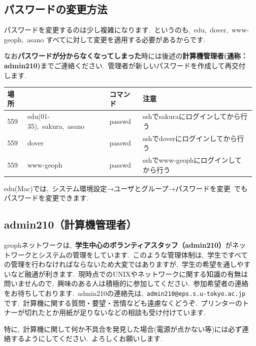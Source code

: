 \documentclass{jarticle}
\begin{document}
\subsection{パスワードの変更方法}
パスワードを変更するのは少し複雑になります.\ というのも,\ edu,\ dover,\ www-geoph,\ asano  すべてに対して変更を適用する必要があるからです.\ 

なお{\bf パスワードが分からなくなってしまった}時には後述の{\bf 計算機管理者(通称：admin210)}までご連絡ください.\ 管理者が新しいパスワードを作成して再交付します.\ 

\begin{table}[H]
  \centering
  \begin{tabular}{|l|l|l|l|} \hline
    場所 & & コマンド & 注意 \\ \hline
    559 & edu(01-35),\ sakura,\ asano & passwd & sshでsakuraにログインしてから行う \\ \hline
    559 & dover & passwd & sshでdoverにログインしてから行う  \\ \hline
    559 & www-geoph & passwd & sshでwww-geophにログインしてから行う  \\ \hline

  \end{tabular}
\end{table}
edu(Mac)では,\ システム環境設定→ユーザとグループ→パスワードを変更\ でもパスワードを変更できます.\ 

\subsection{admin210（計算機管理者）}
geophネットワークは,\ {\bf 学生中心のボランティアスタッフ（admin210）}がネットワークとシステムの管理をしています.\ 
このような管理体制は,\ 学生ですべての管理を行わなければならないため大変ではありますが,\ 学生の希望を通しやすいなど融通が利きます.\ 
現時点でのUNIXやネットワークに関する知識の有無は問いませんので,\ 興味のある人は積極的に参加してください.\ 
参加希望者の連絡をお待ちしております.\ 
admin210の連絡先は,\ \verb|admin210@eps.s.u-tokyo.ac.jp|です.\ 
計算機に関する質問・要望・苦情なども遠慮なくどうぞ.\ プリンターのトナーが切れたとか用紙が足りないなどの相談も受け付けています.\ 

特に,\ 計算機に関して何か不具合を発見した場合(電源が点かない等)には必ず連絡するようにしてください.\ よろしくお願いします.\ 

\end{document}
